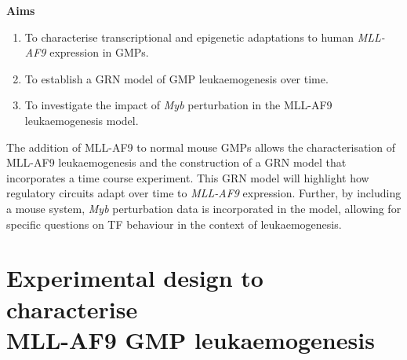 \noindent
\textbf{Aims}

\vspace*{-5mm}
\begin{enumerate}
    \item To characterise transcriptional and epigenetic adaptations to human \textit{MLL-AF9} expression in GMPs. 
    \item To establish a GRN model of GMP leukaemogenesis over time.
    \item To investigate the impact of \textit{Myb} perturbation in the MLL-AF9 leukaemogenesis model.
\end{enumerate}

\vspace*{-5mm}
The addition of MLL-AF9 to normal mouse GMPs allows the characterisation of MLL-AF9 leukaemogenesis and the construction of a GRN model that incorporates a time course experiment. This GRN model will highlight how regulatory circuits adapt over time to \textit{MLL-AF9} expression. Further, by including a \mybmre{} mouse system, \textit{Myb }perturbation data is incorporated in the model, allowing for specific questions on TF behaviour in the context of leukaemogenesis.

\clearpage
\section[Experimental design to characterise MLL-AF9 GMP leukaemogenesis]{\label{ch5:MethoCult}Experimental design to characterise\\MLL-AF9 GMP leukaemogenesis}

